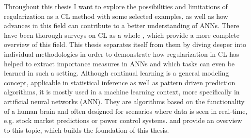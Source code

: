 Throughout this thesis I want to explore the possibilities and limitations of regularization as a CL method with some selected examples, as well as how advances in this field can contribute to a better understanding of ANNs. There have been thorough surveys on CL as a whole \cite{LW, verwimp2024continuallearningapplicationsroad, bidaki2025}, which provide a more complete overview of this field. This thesis separates itself from them by diving deeper into individual methodologies in order to demonstrate how regularization in CL has helped to extract importance measures in ANNs and which tasks can even be learned in such a setting.
Although continual learning is a general modeling concept, applicable in statistical inference as well as pattern driven prediction algorithms, it is mostly used in a machine learning context, more specifically in artificial neural networks (ANN). They are algorithms based on the functionality of a human brain and often designed for scenarios where data is seen in real-time, e.g. stock market predictions or power control systems. \citeauthor{Du_2019} \cite{Du_2019} and \citeauthor{Fahrmeir_2022} \cite{Fahrmeir_2022} provide an overview to this topic, which builds the foundation of this thesis. 

